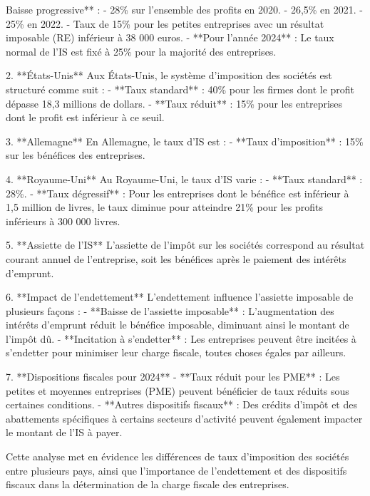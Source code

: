 \documentclass[a4paper, 12pt]{report}
\begin{document}
Baisse progressive** :
- 28\% sur l'ensemble des profits en 2020.
- 26,5\% en 2021.
- 25\% en 2022.
- Taux de 15\% pour les petites entreprises avec un résultat imposable (RE) inférieur à 38 000 euros.
- **Pour l'année 2024** : Le taux normal de l'IS est fixé à 25\% pour la majorité des entreprises.

2. **États-Unis**  
Aux États-Unis, le système d'imposition des sociétés est structuré comme suit :
- **Taux standard** : 40\% pour les firmes dont le profit dépasse 18,3 millions de dollars.
- **Taux réduit** : 15\% pour les entreprises dont le profit est inférieur à ce seuil.

3. **Allemagne**  
En Allemagne, le taux d'IS est :
- **Taux d'imposition** : 15\% sur les bénéfices des entreprises.

4. **Royaume-Uni**  
Au Royaume-Uni, le taux d'IS varie :
- **Taux standard** : 28\%.
- **Taux dégressif** : Pour les entreprises dont le bénéfice est inférieur à 1,5 million de livres, le taux diminue pour atteindre 21\% pour les profits inférieurs à 300 000 livres.

5. **Assiette de l'IS**  
L'assiette de l'impôt sur les sociétés correspond au résultat courant annuel de l'entreprise, soit les bénéfices après le paiement des intérêts d'emprunt.

6. **Impact de l'endettement**  
L'endettement influence l'assiette imposable de plusieurs façons :
- **Baisse de l'assiette imposable** : L'augmentation des intérêts d'emprunt réduit le bénéfice imposable, diminuant ainsi le montant de l'impôt dû.
- **Incitation à s'endetter** : Les entreprises peuvent être incitées à s'endetter pour minimiser leur charge fiscale, toutes choses égales par ailleurs.

7. **Dispositions fiscales pour 2024**  
- **Taux réduit pour les PME** : Les petites et moyennes entreprises (PME) peuvent bénéficier de taux réduits sous certaines conditions.
- **Autres dispositifs fiscaux** : Des crédits d'impôt et des abattements spécifiques à certains secteurs d'activité peuvent également impacter le montant de l'IS à payer.

Cette analyse met en évidence les différences de taux d'imposition des sociétés entre plusieurs pays, ainsi que l'importance de l'endettement et des dispositifs fiscaux dans la détermination de la charge fiscale des entreprises.
\end{document}
